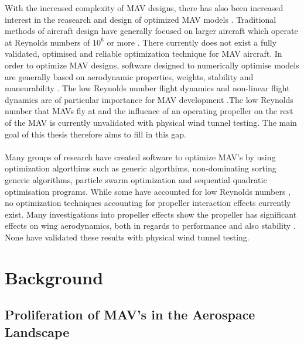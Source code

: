 With the increased complexity of MAV designs, there has also been increased interest in the reasearch and design of optimized MAV models \cite{Ward2017}. Traditional methods of aircraft design have generally focused on larger aircraft which operate at Reynolds numbers of $10^6$ or more \cite{Raymer2006} \cite{Roskam1989}. There currently does not exist a fully validated, optimised and reliable optimization technique for MAV aircraft. In order to optimize MAV designs, software designed to numerically optimise models are generally based on aerodynamic properties, weights, stability and maneurability \cite{Amadori2012} \cite{Vijayanandh2019} \cite{Radmanesh2014}. The low Reynolds number flight dynamics and non-linear flight dynamics are of particular importance for MAV development \cite{Aboelezz2020} \cite{Aboelezz2021}.The low Reynolds number that MAVs fly at and the influence of an operating propeller on the rest of the MAV is currently unvalidated with physical wind tunnel testing. The main goal of this thesis therefore aims to fill in this gap.\\
\\
Many groups of research have created software to optimize MAV's by using optimization algorthims such as generic algorthims, non-dominating sorting generic algorithms, particle swarm optimization and sequential quadratic optimisation programs.  While some have accounted for low Reynolds numbers \cite{Bronz2009} \cite{Vijayanandh2019} \cite{HASSANALIAN2019}, no optimization techniques accounting for propeller interaction effects currently exist. Many investigations into propeller effects show the propeller has significant effects on wing aerodynamics, both in regards to performance and also stability \cite{Shams2020b} \cite{Chen2022} \cite{Aminaei2018} \cite{Null2005} \cite{Parga2007} \cite{Harikumar2021} \cite{Jana2020}. None have validated these results with physical wind tunnel testing.
\section{Background}

\subsection{Proliferation of MAV's in the Aerospace Landscape}
\label{subsec:ProliferationMAVs}

